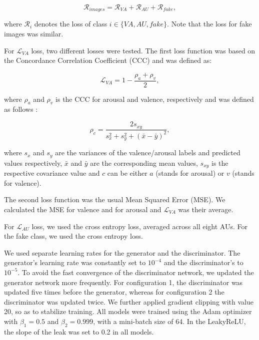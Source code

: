 \documentclass[a4paper, 10pt, conference]{ieeeconf}      %
\begin{document}
\vskip -0.3cm

\begin{equation} \label{eq_3}
\mathcal{R}_{images} = \mathcal{R}_{VA} + \mathcal{R}_{AU} + \mathcal{R}_{fake} , 
\end{equation}

where $\mathcal{R}_{i}$ denotes the loss of class $i \in \{VA,AU,fake\} $. Note that the loss for fake images was similar.

For $\mathcal{L}_{VA}$ loss, two different losses were tested.
The first loss function was based on the Concordance Correlation Coefficient (CCC) and was defined as:

\begin{equation} \label{eq_4}
\mathcal{L}_{VA} = 1 - \frac{\rho_a + \rho_v}{2},
\end{equation}

where $\rho_a$ and $\rho_v$ is the CCC for arousal and valence, respectively and was defined as follows  :

\begin{equation} \label{eq_5}
\rho_c = \frac{2 s_{xy}}{s_x^2 + s_y^2 + (\bar{x} - \bar{y})^2},
\end{equation}

\noindent
where $s_x$ and $s_y$ are the variances of the valence/arousal labels and predicted values respectively, $\bar{x}$ and $\bar{y}$ are the corresponding mean values,  $s_{xy}$ is the respective covariance value and $c$ can be either $a$ (stands for arousal) or $v$ (stands for valence).

The second loss function was the usual Mean Squared Error (MSE). We calculated the MSE for valence and for arousal and $\mathcal{L}_{VA}$ was their average.

For $\mathcal{L}_{AU}$ loss, we used the cross entropy loss, averaged across all eight AUs. 
For the fake class, we used the cross entropy loss.

We used separate learning rates for the generator and the discriminator. The generator's learning rate was constantly set to  $10^{-4}$ and the discriminator's to $10^{-5}$. To avoid the fast convergence of the discriminator network, we updated the generator network more frequently. For configuration 1, the discriminator was updated five times before the generator, whereas for configuration 2 the discriminator was updated twice. We further applied gradient clipping with value 20, so as to stabilize training. All models were trained using the Adam optimizer with $\beta_1 = 0.5$ and $\beta_2 = 0.999$, with a mini-batch size of 64. In the LeakyReLU, the slope of the leak was set to 0.2 in all models. 
\end{document}
